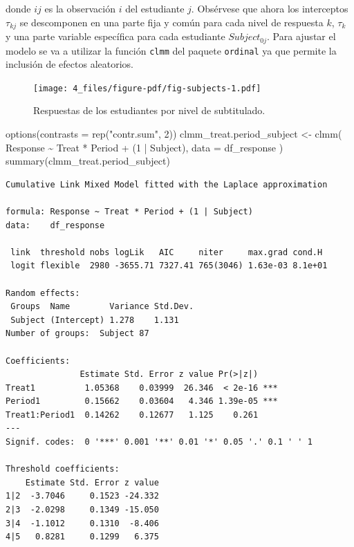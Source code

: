 \documentclass[
  12pt,
  a4paper,
  extrafontsizes,
  onecolumn,
  openright,
  table]{memoir}
\newenvironment{Shaded}{\begin{snugshade}}{\end{snugshade}}
\newcommand{\AttributeTok}[1]{\textcolor[rgb]{0.40,0.45,0.13}{#1}}
\newcommand{\DecValTok}[1]{\textcolor[rgb]{0.68,0.00,0.00}{#1}}
\newcommand{\FunctionTok}[1]{\textcolor[rgb]{0.28,0.35,0.67}{#1}}
\newcommand{\NormalTok}[1]{\textcolor[rgb]{0.00,0.23,0.31}{#1}}
\newcommand{\OtherTok}[1]{\textcolor[rgb]{0.00,0.23,0.31}{#1}}
\newcommand{\SpecialCharTok}[1]{\textcolor[rgb]{0.37,0.37,0.37}{#1}}
\newcommand{\StringTok}[1]{\textcolor[rgb]{0.13,0.47,0.30}{#1}}
\begin{document}
donde \(ij\) es la observación \(i\) del estudiante \(j\). Obsérvese que
ahora los interceptos \(\tau_{kj}\) se descomponen en una parte fija y
común para cada nivel de respuesta \(k\), \(\tau_{k}\) y una parte
variable específica para cada estudiante \(Subject_{0j}\). Para ajustar
el modelo se va a utilizar la función \texttt{clmm} del paquete
\texttt{ordinal} \autocite[ver][]{ordinalR} ya que permite la inclusión
de efectos aleatorios.

\scriptsize

\begin{figure}[h]

{\centering \texttt{[image: 4\_files/figure-pdf/fig-subjects-1.pdf]}

}

\caption{\label{fig-subjects}Respuestas de los estudiantes por nivel de
subtitulado.}

\end{figure}

\normalsize

\scriptsize

\begin{Shaded}
\begin{Highlighting}[]
\FunctionTok{options}\NormalTok{(}\AttributeTok{contrasts =} \FunctionTok{rep}\NormalTok{(}\StringTok{"contr.sum"}\NormalTok{, }\DecValTok{2}\NormalTok{))}
\NormalTok{clmm\_treat.period\_subject }\OtherTok{\textless{}{-}} \FunctionTok{clmm}\NormalTok{(}
\NormalTok{    Response }\SpecialCharTok{\textasciitilde{}}\NormalTok{ Treat }\SpecialCharTok{*}\NormalTok{ Period }\SpecialCharTok{+}\NormalTok{ (}\DecValTok{1} \SpecialCharTok{|}\NormalTok{ Subject),}
    \AttributeTok{data =}\NormalTok{ df\_response}
\NormalTok{)}
\FunctionTok{summary}\NormalTok{(clmm\_treat.period\_subject)}
\end{Highlighting}
\end{Shaded}

\begin{verbatim}
Cumulative Link Mixed Model fitted with the Laplace approximation

formula: Response ~ Treat * Period + (1 | Subject)
data:    df_response

 link  threshold nobs logLik   AIC     niter     max.grad cond.H 
 logit flexible  2980 -3655.71 7327.41 765(3046) 1.63e-03 8.1e+01

Random effects:
 Groups  Name        Variance Std.Dev.
 Subject (Intercept) 1.278    1.131   
Number of groups:  Subject 87 

Coefficients:
               Estimate Std. Error z value Pr(>|z|)    
Treat1          1.05368    0.03999  26.346  < 2e-16 ***
Period1         0.15662    0.03604   4.346 1.39e-05 ***
Treat1:Period1  0.14262    0.12677   1.125    0.261    
---
Signif. codes:  0 '***' 0.001 '**' 0.01 '*' 0.05 '.' 0.1 ' ' 1

Threshold coefficients:
    Estimate Std. Error z value
1|2  -3.7046     0.1523 -24.332
2|3  -2.0298     0.1349 -15.050
3|4  -1.1012     0.1310  -8.406
4|5   0.8281     0.1299   6.375
\end{verbatim}
\end{document}
